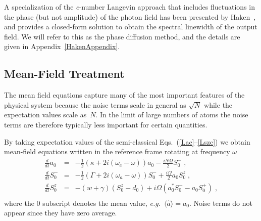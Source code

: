 \documentclass[aps,
twocolumn,
showpacs,
superscriptaddress,groupedaddress]{revtex4}
\begin{document}
A specialization of the \textit{c}-number Langevin approach that includes
fluctuations in the phase (but not amplitude) of the photon field has
been presented by Haken~\cite{HakenLaserBook}, and provides a
closed-form solution to obtain the spectral linewidth of the output
field. We will refer to this as the phase diffusion method, and the
details are given in Appendix~\ref{HakenAppendix}.


\subsection{Mean-Field Treatment}
\label{MFE}

The mean field equations capture many of the most important features of
the physical system because the noise terms scale in general as
$\sqrt{N}$ while the expectation values scale as~$N$.  In the limit of
large numbers of atoms the noise terms are therefore typically less
important for certain quantities.

By taking expectation values of the semi-classical
Eqs.~(\ref{Lac}--\ref{Lszc}) we obtain mean-field
equations written in the reference frame rotating at frequency
$\omega$
\begin{eqnarray}
\frac{d}{dt} a_0&=& -\frac{1}{2} (\kappa +2i(\omega_c-\omega)) a_0
-\frac{i N \Omega}{2} S_0^{-}\;,
\label{La0}\\
\frac{d}{dt} S_0^{-} &=&
-\frac{1}{2} \left(\Gamma +2 i (\omega_a-\omega) \right)  S_0^{-}
+\frac{i \Omega}{2} a_0 S_0^{z}\;,\\
\frac{d}{dt} S_0^{z} &=& -(w+\gamma)\left( S_0^{z} - d_0\right)
+i\Omega \left( a_0^{*} S_0^{-} - a_0 S_0^{+} \right)\;,\nonumber\\
\label{Lsz0}
\end{eqnarray}
where the $0$ subscript denotes the mean value, {\it e.g.}\ $\langle
\hat{a} \rangle =a_0$.  Noise terms do not appear since they have zero
average.
\end{document}
